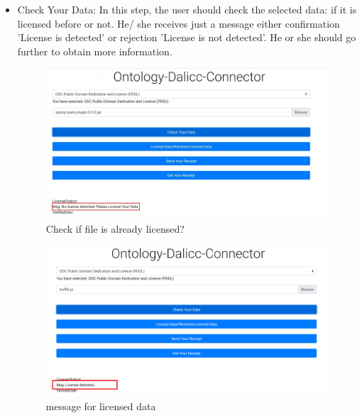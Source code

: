\begin{itemize}
\begin{center}
\begin{figure}[htb!]
	\end{figure}
\end{center}
	\item Check Your Data:
	In this step, the user should check the selected data: if it is licensed before or not. He/ she receives just a message either confirmation 'License is detected' or rejection 'License is not detected'. He or she should go further to obtain more information.
    \begin{center}
	\begin{figure}[htb!]
		
		\begin{minipage}{0.45\linewidth}
			\centering
			\includegraphics[width=1.95\textwidth]{images/chap03_checkFile.jpg}
		\end{minipage}
		\caption[Check if file is already licensed?]{Check if file is already licensed?}
		
	\end{figure}
	
\end{center}

\begin{center}
	\begin{figure}[htb!]
		
		\begin{minipage}{0.45\linewidth}
			\centering
			\includegraphics[width=1.95\textwidth]{images/chap03_found_license.png}
		\end{minipage}
		\caption[message for licensed data]{message for licensed data}
		

\end{figure}
\end{center}
\end{itemize}
